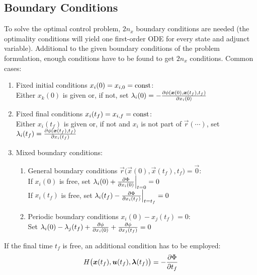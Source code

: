 		\subsection{Boundary Conditions}
			\label{subsec:boundary}

			To solve the optimal control problem, \(2n_x\) boundary conditions are needed (the optimality conditions will yield one first-order ODE for every state and adjunct variable). Additional to the given boundary conditions of the problem formulation, enough conditions have to be found to get \(2n_x\) conditions. Common cases:
			\begin{enumerate}[label = (\roman*)]
				\item Fixed initial conditions \( x_i(0) = x_{i, 0} = \operatorname{const} \): \\
						Either \( x_k(0) \) is given or, if not, set \( \lambda_i(0) = -\pdv{\phi(\bm{x}(0), \bm{x}(t_f), t_f)}{x_i(0)} \)
				\item Fixed final conditions \( x_i(t_f) = x_{i, f} = \operatorname{const} \): \\
						Either \( x_i(t_f) \) is given or, if not and \(x_i\) is not part of \( \vec{r}(\cdots) \), set \( \lambda_i(t_f) = \pdv{\phi(\bm{x}(t_f), t_f)}{x_i(t_f)} \)
				\item Mixed boundary conditions:
					\begin{enumerate}
						\item General boundary conditions \( \vec{r}\big(\vec{x}(0), \vec{x}(t_f), t_f\big) = \vec{0} \): \\
								If \( x_i(0) \) is free, set \( \lambda_i(0) + \pdv{\Phi}{x_i(0)} \Big\vert_{t = 0} = 0 \) \\
								If \( x_i(t_f) \) is free, set \( \lambda_i(t_f) - \pdv{\Phi}{x_i(t_f)} \Big\vert_{t = t_f} = 0 \)
						\item Periodic boundary conditions \( x_i(0) - x_j(t_f) = 0 \): \\
								Set \( \lambda_i(0) - \lambda_j(t_f) + \pdv{\phi}{x_i(0)} + \pdv{\phi}{x_j(t_f)} = 0 \)
					\end{enumerate}
			\end{enumerate}
			If the final time \(t_f\) is free, an additional condition has to be employed:
			\begin{align*}
				H\big(\bm{x}(t_f), \bm{u}(t_f), \bm{\lambda}(t_f)\big) = -\pdv{\Phi}{t_f}
			\end{align*}

